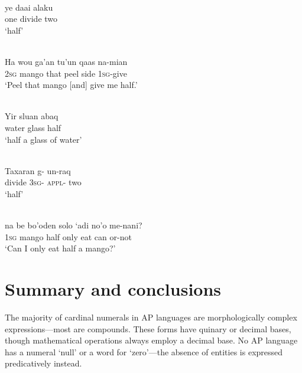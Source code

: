 \ea%
\label{bkm:Ref342746708}
\\
\gll  ye  daai  alaku   \\  
    one  divide  two    \\
\glt  `half' 
\z








\ea%
\label{bkm:Ref342746924}
\\
\gll  Ha  wou  ga'an  tu'un  qaas  na-mian \\  
     \textsc{2sg} mango  that  peel  side  \textsc{1sg}{}-give \\
\glt  `Peel that mango [and] give me half.'
\z








\ea%
\label{bkm:Ref342746926}
\\
\gll   Yir  sluan  abaq   \\  
    water  glass  half      \\
\glt  `half a glass of water'
\z

               

              




\ea%
\label{bkm:Ref342746963}
\\
\gll   Taxaran  g-  un-raq   \\  
   divide  \textsc{3sg-}  \textsc{appl-} two      \\
\glt `half' 
\z

               

               
\ea
\label{ex:8:1250}
\\
\gll na  be  bo'oden  solo  `adi  no'o  me-nani? \\
  1\textsc{sg } mango  half  only  eat  can  or-not\\
\glt `Can I only eat half a mango?'
\z
 
 

 

\section{Summary and conclusions}
\label{sec:8:Summary}
The majority of cardinal numerals in AP languages are morphologically complex expressions---most are compounds. These forms have quinary or decimal bases, though mathematical operations always employ a decimal base. No AP language has a numeral `null' or a word for `zero'---the absence of entities is expressed predicatively instead.

